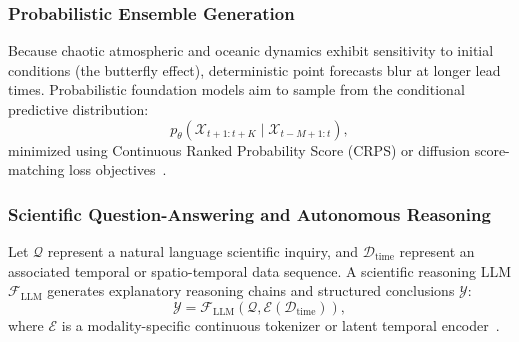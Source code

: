 \subsubsection{Probabilistic Ensemble Generation}
Because chaotic atmospheric and oceanic dynamics exhibit sensitivity to initial conditions (the butterfly effect), deterministic point forecasts blur at longer lead times. Probabilistic foundation models aim to sample from the conditional predictive distribution:
\begin{equation}
    p_\theta(\mathcal{X}_{t+1:t+K} \mid \mathcal{X}_{t-M+1:t}),
\end{equation}
minimized using Continuous Ranked Probability Score (CRPS) or diffusion score-matching loss objectives~\cite{price2023gencast}.

\subsubsection{Scientific Question-Answering and Autonomous Reasoning}
Let $\mathcal{Q}$ represent a natural language scientific inquiry, and $\mathcal{D}_{\text{time}}$ represent an associated temporal or spatio-temporal data sequence. A scientific reasoning LLM $\mathcal{F}_{\text{LLM}}$ generates explanatory reasoning chains and structured conclusions $\mathcal{Y}$:
\begin{equation}
    \mathcal{Y} = \mathcal{F}_{\text{LLM}}(\mathcal{Q}, \mathcal{E}(\mathcal{D}_{\text{time}})),
\end{equation}
where $\mathcal{E}$ is a modality-specific continuous tokenizer or latent temporal encoder~\cite{wu2025scits}.
